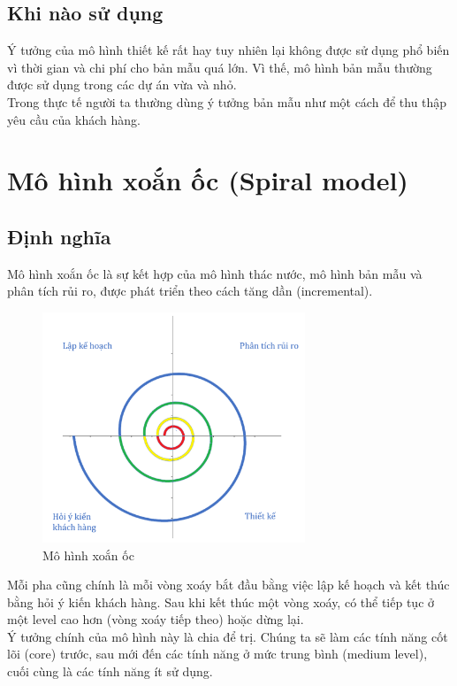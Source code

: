 \documentclass[14pt]{extarticle}
\begin{document}
\subsection{Khi nào sử dụng}
Ý tưởng của mô hình thiết kế rất hay tuy nhiên lại không được sử dụng phổ biến
vì thời gian và chi phí cho bản mẫu quá lớn.
Vì thế, mô hình bản mẫu thường được sử dụng trong các dự án vừa và nhỏ.\\

Trong thực tế người ta thường dùng ý tưởng bản mẫu như một cách để thu thập
yêu cầu của khách hàng.

\newpage
\section{Mô hình xoắn ốc (Spiral model)}
\subsection{Định nghĩa}

Mô hình xoắn ốc là sự kết hợp của mô hình thác nước, mô hình bản mẫu
và phân tích rủi ro, được phát triển theo cách tăng dần (incremental).\\

\begin{figure}[h]
  \centering
  \includegraphics[width=0.7\textwidth]{spiral.png}
  \caption{Mô hình xoắn ốc}
  \label{fig:spiral-model}
\end{figure}

Mỗi pha cũng chính là mỗi vòng xoáy bắt đầu bằng việc lập kế hoạch
và kết thúc bằng hỏi ý kiến khách hàng. Sau khi kết thúc một vòng xoáy,
có thể tiếp tục ở một level cao hơn (vòng xoáy tiếp theo) hoặc dừng lại.\\
Ý tưởng chính của mô hình này là chia để trị. Chúng ta sẽ làm các tính
năng cốt lõi (core) trước, sau mới đến các tính năng ở mức trung bình
(medium level), cuối cùng là các tính năng ít sử dụng.\\
\end{document}

